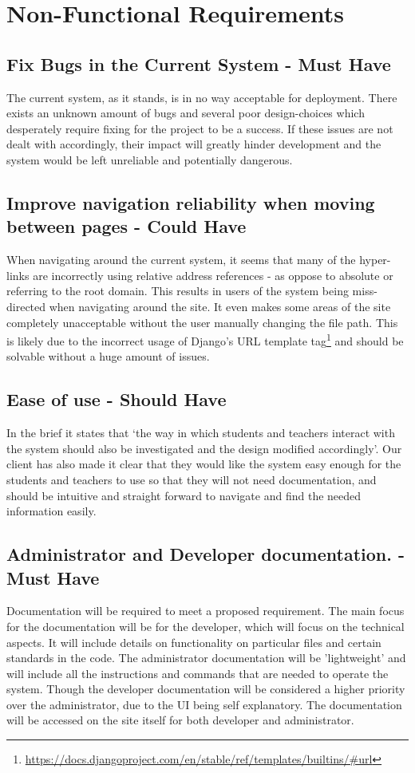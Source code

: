 \documentclass[12pt]{article}
\begin{document}
	\newpage
	
	\section{Non-Functional Requirements}
	\subsection{Fix Bugs in the Current System - Must Have}
	The current system, as it stands, is in no way acceptable for deployment. There exists an unknown amount of bugs and several poor design-choices which desperately require fixing for the project to be a success. If these issues are not dealt with accordingly, their impact will greatly hinder development and the system would be left unreliable and potentially dangerous.
	\subsection{Improve navigation reliability when moving between pages - Could Have}
	When navigating around the current system, it seems that many of the hyper-links are incorrectly using relative address references - as oppose to absolute or referring to the root domain. This results in users of the system being miss-directed when navigating around the site. It even makes some areas of the site completely unacceptable without the user manually changing the file path.  This is likely due to the incorrect usage of Django's URL template tag\footnote{\url{https://docs.djangoproject.com/en/stable/ref/templates/builtins/#url}} and should be solvable without a huge amount of issues.
	\subsection{Ease of use - Should Have}
	In the brief it states that ‘the way in which students and teachers interact with the system should also be investigated and the design modified accordingly’. Our client has also made it clear that they would like the system easy enough for the students and teachers to use so that they will not need documentation, and should be intuitive and straight forward to navigate and find the needed information easily.
	\subsection{Administrator and Developer documentation. - Must Have}
	Documentation will be required to meet a proposed requirement. The main focus for the documentation will be for the developer, which will focus on the technical aspects. It will include details on functionality on particular files and certain standards in the code. The administrator documentation will be 'lightweight' and will include all the instructions and commands that are needed to operate the system. Though the developer documentation will be considered a higher priority over the administrator, due to the UI being self explanatory. The documentation will be accessed on the site itself for both developer and administrator. 
\end{document}
